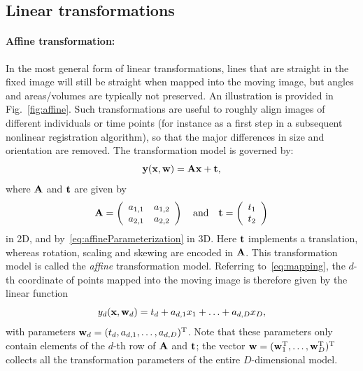 \documentclass[10pt,twoside]{book}
\begin{document}
\subsection{Linear transformations}

% 
% 

\paragraph{Affine transformation:}
In the most general form of linear transformations, lines that are straight in the fixed image will still be straight when mapped into the moving image, but angles and areas/volumes are typically not preserved. 
An illustration is provided in Fig.~\ref{fig:affine}.
Such transformations are useful to roughly align images of different individuals or time points (for instance as a first step in a subsequent nonlinear registration algorithm), so that the major differences in size and orientation are removed. The transformation model is governed by:
$$
\mathbf{y}( \mathbf{x}, \mathbf{w} ) = \mathbf{A} \mathbf{x} + \mathbf{t}
,
$$
where $\mathbf{A}$ and $\mathbf{t}$ are given by
$$
\mathbf{A} = 
\left(
\begin{array}{cc}
a_{1,1} & a_{1,2} \\
a_{2,1} & a_{2,2} 
\end{array}
\right)
\quad
\text{and}
\quad
\mathbf{t}
=
\left(
\begin{array}{c}
t_1 \\
t_2
\end{array}
\right)
$$
in 2D,
and by~\eqref{eq:affineParameterization} in 3D.
Here $\mathbf{t}$ implements a translation, whereas rotation, scaling and skewing are 
encoded in
$\mathbf{A}$.
%
This transformation model is called the \emph{affine} transformation model.
%
Referring to~\eqref{eq:mapping},
the $d$-th coordinate of points mapped into the moving image is therefore given by the linear function
\begin{equation}
y_d( \mathbf{x}, \mathbf{w}_d ) = t_d + a_{d,1} x_1 + \ldots + a_{d,D} x_D 
,
\label{eq:affineOneDirection}
\end{equation}
with parameters $\mathbf{w}_d = (t_d, a_{d,1}, \ldots, a_{d,D})^\mathrm{T}$.
Note that these parameters only contain elements of the $d$-th row of $\mathbf{A}$ and $\mathbf{t}$;
the vector $\mathbf{w} = (\mathbf{w}_1^\mathrm{T}, \ldots, \mathbf{w}_D^\mathrm{T})^\mathrm{T}$ collects all the transformation parameters of the entire $D$-dimensional model.
\end{document}
